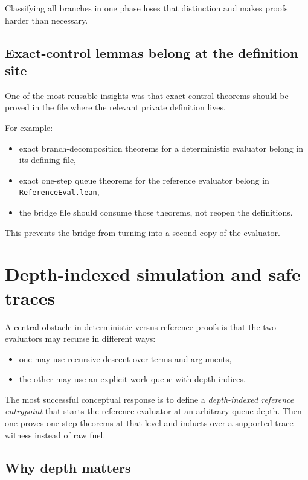 \documentclass[11pt]{article}
\newcommand{\code}[1]{\texttt{#1}}
\newcommand{\term}[1]{\emph{#1}}
\begin{document}
Classifying all branches in one phase loses that distinction and makes proofs harder than necessary.

\subsection{Exact-control lemmas belong at the definition site}

One of the most reusable insights was that exact-control theorems should be proved in the file where the relevant private definition lives.

For example:

\begin{itemize}
  \item exact branch-decomposition theorems for a deterministic evaluator belong in its defining file,
  \item exact one-step queue theorems for the reference evaluator belong in \code{ReferenceEval.lean},
  \item the bridge file should consume those theorems, not reopen the definitions.
\end{itemize}

This prevents the bridge from turning into a second copy of the evaluator.

\section{Depth-indexed simulation and safe traces}

A central obstacle in deterministic-versus-reference proofs is that the two evaluators may recurse in different ways:

\begin{itemize}
  \item one may use recursive descent over terms and arguments,
  \item the other may use an explicit work queue with depth indices.
\end{itemize}

The most successful conceptual response is to define a \term{depth-indexed reference entrypoint} that starts the reference evaluator at an arbitrary queue depth. Then one proves one-step theorems at that level and inducts over a supported trace witness instead of raw fuel.

\subsection{Why depth matters}
\end{document}
